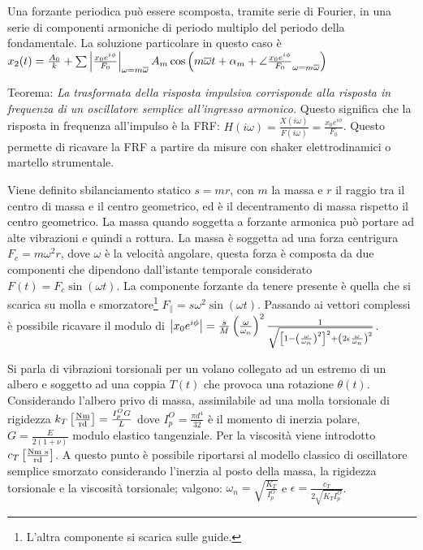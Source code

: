 
Una forzante periodica può essere scomposta, tramite serie di Fourier, in una serie di componenti armoniche di periodo multiplo del periodo della fondamentale. La soluzione particolare in questo caso è \(x_2(t) = \frac{A_0}{k} + \sum \left|\frac{x_0 e^{i\phi}}{F_0}\right|_{\omega=m\overline{\omega}} A_m \cos{\left( m\overline{\omega} t + \alpha_m + \angle{\frac{x_0 e^{i\phi}}{F_0}}_{\omega=m\overline{\omega}} \right)}\)

Teorema: \textit{La trasformata della risposta impulsiva corrisponde alla risposta in frequenza di un oscillatore semplice all'ingresso armonico.}
Questo significa che la risposta in frequenza all'impulso è la FRF: \(H(i\omega) = \frac{X(i\omega)}{F(i\omega)} = \frac{x_0 e^{i\phi}}{F_0}\).
Questo permette di ricavare la FRF a partire da misure con shaker elettrodinamici o martello strumentale.


Viene definito sbilanciamento statico \( s=mr \), con \(m\) la massa e \(r\) il raggio tra il centro di massa e il centro geometrico, ed è il decentramento di massa rispetto il centro geometrico. La massa quando soggetta a forzante armonica può portare ad alte vibrazioni e quindi a rottura.
La massa è soggetta ad una forza centrigura \(F_c = m\omega^2 r\), dove \(\omega\) è la velocità angolare, questa forza è composta da due componenti che dipendono dall'istante temporale considerato \(F(t)=F_c \sin{(\omega t)}\).
La componente forzante da tenere presente è quella che si scarica su molla e smorzatore\footnote{L'altra componente si scarica sulle guide.} \( F_\parallel = s\omega^2 \sin{(\omega t)} \).
Passando ai vettori complessi è possibile ricavare il modulo di \(\left|x_0 e^{i\phi}\right| = \frac{s}{M}\left(\frac{\omega}{\omega_n}\right)^2 \frac{1}{\sqrt{\left[ 1-\left( \frac{\omega}{\omega_n} \right)^2  \right]^2 + \left( 2\epsilon \frac{\omega}{\omega_n} \right)^2}}\).


Si parla di vibrazioni torsionali per un volano collegato ad un estremo di un albero e soggetto ad una coppia \(T(t)\) che provoca una rotazione \(\theta(t)\).
Considerando l'albero privo di massa, assimilabile ad una molla torsionale di rigidezza \(k_T \left[\frac{\text{Nm}}{\text{rd}}\right] = \frac{I_p^O G}{L}\) dove \(I_p^O = \frac{\pi d^4}{32}\) è il momento di inerzia polare, \(G = \frac{E}{2(1+\nu)}\) modulo elastico tangenziale.
Per la viscosità viene introdotto \(c_T \left[\frac{\text{Nm s}}{\text{rd}}\right]\).
A questo punto è possibile riportarsi al modello classico di oscillatore semplice smorzato considerando l'inerzia al posto della massa, la rigidezza torsionale e la viscosità torsionale; valgono: \(\omega_n=\sqrt{\frac{K_T}{I^O_p}}\) e \(\epsilon = \frac{c_T}{2\sqrt{K_T I^O_p}}\).

